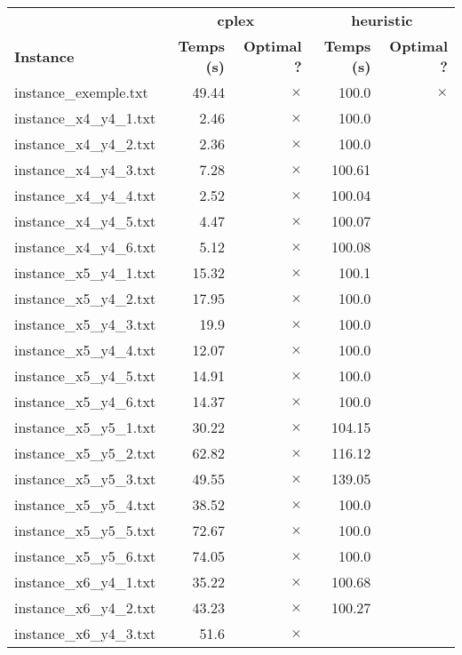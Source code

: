 \documentclass{article}
\begin{document}
\begin{center}
\renewcommand{\arraystretch}{1.4} 
 \begin{tabular}{lrrrr}
	\hline
 & \multicolumn{2}{c}{\textbf{cplex}} & \multicolumn{2}{c}{\textbf{heuristic}}\\
\textbf{Instance}  & \textbf{Temps (s)} & \textbf{Optimal ?}  & \textbf{Temps (s)} & \textbf{Optimal ?} \\\hline

instance\_exemple.txt & 49.44 & 
$\times$
 & 100.0 & 
$\times$
\\
instance\_x4\_y4\_1.txt & 2.46 & 
$\times$
 & 100.0 & 
\\
instance\_x4\_y4\_2.txt & 2.36 & 
$\times$
 & 100.0 & 
\\
instance\_x4\_y4\_3.txt & 7.28 & 
$\times$
 & 100.61 & 
\\
instance\_x4\_y4\_4.txt & 2.52 & 
$\times$
 & 100.04 & 
\\
instance\_x4\_y4\_5.txt & 4.47 & 
$\times$
 & 100.07 & 
\\
instance\_x4\_y4\_6.txt & 5.12 & 
$\times$
 & 100.08 & 
\\
instance\_x5\_y4\_1.txt & 15.32 & 
$\times$
 & 100.1 & 
\\
instance\_x5\_y4\_2.txt & 17.95 & 
$\times$
 & 100.0 & 
\\
instance\_x5\_y4\_3.txt & 19.9 & 
$\times$
 & 100.0 & 
\\
instance\_x5\_y4\_4.txt & 12.07 & 
$\times$
 & 100.0 & 
\\
instance\_x5\_y4\_5.txt & 14.91 & 
$\times$
 & 100.0 & 
\\
instance\_x5\_y4\_6.txt & 14.37 & 
$\times$
 & 100.0 & 
\\
instance\_x5\_y5\_1.txt & 30.22 & 
$\times$
 & 104.15 & 
\\
instance\_x5\_y5\_2.txt & 62.82 & 
$\times$
 & 116.12 & 
\\
instance\_x5\_y5\_3.txt & 49.55 & 
$\times$
 & 139.05 & 
\\
instance\_x5\_y5\_4.txt & 38.52 & 
$\times$
 & 100.0 & 
\\
instance\_x5\_y5\_5.txt & 72.67 & 
$\times$
 & 100.0 & 
\\
instance\_x5\_y5\_6.txt & 74.05 & 
$\times$
 & 100.0 & 
\\
instance\_x6\_y4\_1.txt & 35.22 & 
$\times$
 & 100.68 & 
\\
instance\_x6\_y4\_2.txt & 43.23 & 
$\times$
 & 100.27 & 
\\
instance\_x6\_y4\_3.txt & 51.6 & 
$\times$

\end{tabular}
\end{center}
\end{document}
